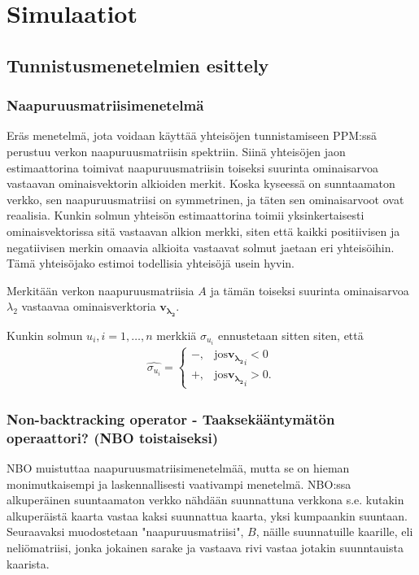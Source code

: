 \documentclass[finnish,12pt,a4paper,pdftex,sci,utf8]{aaltothesis}
\begin{document}
\clearpage
\section{Simulaatiot}

\subsection{Tunnistusmenetelmien esittely}

\subsubsection{Naapuruusmatriisimenetelmä}
Eräs menetelmä, jota voidaan käyttää yhteisöjen tunnistamiseen PPM:ssä perustuu verkon naapuruusmatriisin spektriin. Siinä yhteisöjen jaon estimaattorina toimivat naapuruusmatriisin toiseksi suurinta ominaisarvoa vastaavan ominaisvektorin alkioiden merkit. Koska kyseessä on sunntaamaton verkko, sen naapuruusmatriisi on symmetrinen, ja täten sen ominaisarvoot ovat reaalisia. Kunkin solmun yhteisön estimaattorina toimii yksinkertaisesti ominaisvektorissa sitä vastaavan alkion merkki, siten että kaikki positiivisen ja negatiivisen merkin omaavia alkioita vastaavat solmut jaetaan eri yhteisöihin. Tämä yhteisöjako estimoi todellisia yhteisöjä usein hyvin.

Merkitään verkon naapuruusmatriisia $A$ ja tämän toiseksi suurinta ominaisarvoa $\lambda_2$ vastaavaa ominaisverktoria $\mathbf{v_{\lambda_2}}$.

Kunkin solmun $u_i, i = 1, \ldots, n$ merkkiä $\sigma_{u_i}$ ennustetaan sitten siten, että 
\begin{align*}
	\hat{\sigma_{u_i}} = 
	\begin{cases}
		-, & \text{jos} \mathbf{v_{\lambda_2}}_i < 0 \\
		+, & \text{jos} \mathbf{v_{\lambda_2}}_i > 0.
	\end{cases}
\end{align*}

\subsubsection{Non-backtracking operator - Taaksekääntymätön operaattori? (NBO toistaiseksi)}
NBO muistuttaa naapuruusmatriisimenetelmää, mutta se on hieman monimutkaisempi ja laskennallisesti vaativampi menetelmä. NBO:ssa alkuperäinen suuntaamaton verkko nähdään suunnattuna verkkona s.e. kutakin alkuperäistä kaarta vastaa kaksi suunnattua kaarta, yksi kumpaankin suuntaan. Seuraavaksi muodostetaan "naapuruusmatriisi", $B$, näille suunnatuille kaarille, eli neliömatriisi, jonka jokainen sarake ja vastaava rivi vastaa jotakin suunntauista kaarista. 
\end{document}
